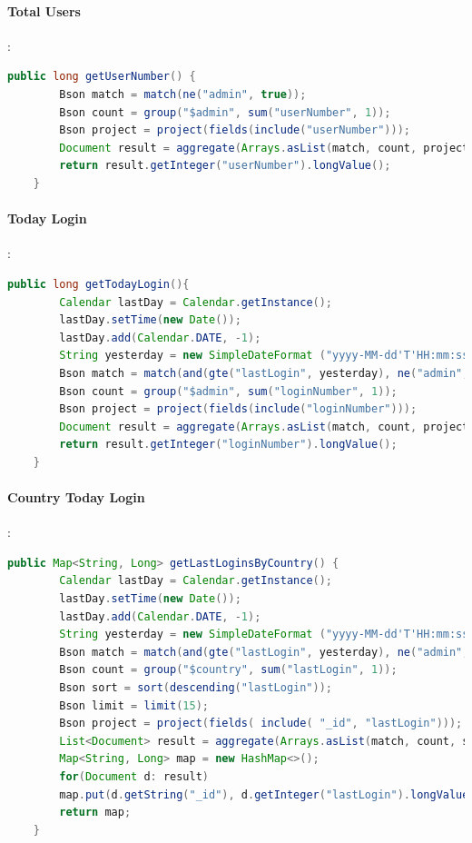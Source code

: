 \paragraph{Total Users}:
\begin{lstlisting}[language=Java]
	public long getUserNumber() {
		Bson match = match(ne("admin", true));
		Bson count = group("$admin", sum("userNumber", 1));
		Bson project = project(fields(include("userNumber")));
		Document result = aggregate(Arrays.asList(match, count, project)).get(0);
		return result.getInteger("userNumber").longValue();
	}
\end{lstlisting}
\paragraph{Today Login}:

\begin{lstlisting}[language=Java]
	public long getTodayLogin(){
		Calendar lastDay = Calendar.getInstance();
		lastDay.setTime(new Date());
		lastDay.add(Calendar.DATE, -1);
		String yesterday = new SimpleDateFormat ("yyyy-MM-dd'T'HH:mm:ss.SSS'Z'", Locale.US).format(lastDay.getTime());
		Bson match = match(and(gte("lastLogin", yesterday), ne("admin", true)));
		Bson count = group("$admin", sum("loginNumber", 1));
		Bson project = project(fields(include("loginNumber")));
		Document result = aggregate(Arrays.asList(match, count, project)).get(0);
		return result.getInteger("loginNumber").longValue();
	}
\end{lstlisting}

\paragraph{Country Today Login}:
\begin{lstlisting}[language=Java]
	public Map<String, Long> getLastLoginsByCountry() {
		Calendar lastDay = Calendar.getInstance();
		lastDay.setTime(new Date());
		lastDay.add(Calendar.DATE, -1);
		String yesterday = new SimpleDateFormat ("yyyy-MM-dd'T'HH:mm:ss.SSS'Z'", Locale.US).format(lastDay.getTime());
		Bson match = match(and(gte("lastLogin", yesterday), ne("admin", true)));
		Bson count = group("$country", sum("lastLogin", 1));
		Bson sort = sort(descending("lastLogin"));
		Bson limit = limit(15);
		Bson project = project(fields( include( "_id", "lastLogin")));
		List<Document> result = aggregate(Arrays.asList(match, count, sort, limit, project));
		Map<String, Long> map = new HashMap<>();
		for(Document d: result)
		map.put(d.getString("_id"), d.getInteger("lastLogin").longValue());
		return map;
	}
\end{lstlisting}

